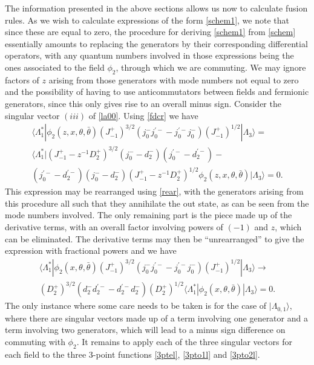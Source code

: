 \documentclass[a4paper,12pt]{article}
\def\thetabar    {\bar{\theta}}
\begin{document}
The information presented in the above sections allows us now to calculate
fusion rules.  As we wish to calculate expressions of the form
\eqref{schem1}, we note that since these are equal to zero, the procedure for
deriving \eqref{schem1} from \eqref{schem} essentially amounts to replacing the
generators by their corresponding differential operators, with any quantum
numbers involved in those expressions being the ones associated to the field
$\phi_2$, through which we are commuting.  We may ignore
factors of $z$ arising from those generators with mode numbers not equal to
zero and the possibility of having to use anticommutators between fields and
fermionic generators, since this only gives rise to an overall minus sign.
Consider  the singular vector $(iii)$ of \eqref{la00}.  Using
\eqref{fdcr} we have
\begin{multline} 
\langle \Lambda^*_1|\phi_2(z,x,\theta,\thetabar)
(J_{-1}^+)^{3/2}(j_0^-j_0^{'-}-j_0^{'-}j_0^-)
(J_{-1}^+)^{1/2}|\Lambda_3\rangle =\\
\langle \Lambda^*_1|(J_{-1}^+-z^{-1}D^+_2)^{3/2}(j_0^-
-d^-_2)(j_0^{'-}-d^{'-}_2)-\\
(j_0^{'-}-d^{'-}_2)(j_0^- -d^-_2)
 (J_{-1}^+-z^{-1}D^+_2)^{1/2}
 \phi_2(z,x,\theta,\thetabar)|\Lambda_3\rangle =0.
\end{multline}
This expression may be rearranged using \eqref{rear}, with the
generators arising from this procedure all such that they annihilate the
out state, as can be seen from the mode numbers involved.  The only
remaining part is the piece made up of the derivative terms, with an 
overall factor involving powers of $(-1)$ and $z$, which can
be eliminated.  The derivative terms may then be ``unrearranged'' to
give the expression with fractional powers and we have
\begin{multline}
\langle \Lambda^*_1|\phi_2(x,\theta,\thetabar)
(J_{-1}^+)^{3/2}(j_0^-j_0^{'-}-j_0^{'-}j_0^-)
(J_{-1}^+)^{1/2}|\Lambda_3\rangle \rightarrow\\ 
(D_2^+)^{3/2}(d_2^-d_2^{'-}-d_2^{'-}d_2^-)
(D_2^+)^{1/2}\langle\Lambda^*_1|\phi_2(x,\theta,\thetabar)
|\Lambda_3\rangle=0.    
\end{multline}
The only instance where some care needs to be taken is for the case of
$|\Lambda_{0,1}\rangle$, where there are singular vectors made up of a term involving one
generator and a term involving two generators, which will lead to a minus
sign difference on commuting with $\phi_2$.  It remains to apply each of the
three singular vectors for each field to the three 3-point functions
\eqref{3ptel}, \eqref{3pto1l} and \eqref{3pto2l}.
\end{document}
